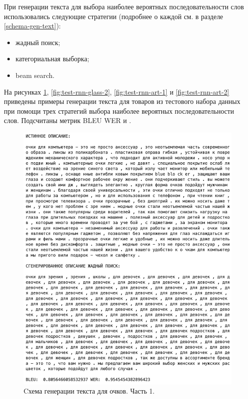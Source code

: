 \documentclass[a4paper,12pt]{extarticle}
\begin{document}
При генерации текста для выбора наиболее вероятных последовательности слов использовались следующие стратегии (подробнее о каждой см. в разделе \ref{schema-gen-text}):
\begin{itemize}
	\item жадный поиск;
	\item категориальная выборка;
	\item beam search.
\end{itemize}

На рисунках \ref{fig:test-rnn-glass-1}, \ref{fig:test-rnn-glass-2}, \ref{fig:test-rnn-art-1} и \ref{fig:test-rnn-art-2} приведены примеры генерации текста для товаров из тестового набора данных при помощи трех стратегий выбора наиболее вероятных последовательности слов. Подсчитаны метрик BLEU WER и .

\begin{figure}[ht]
	\centering
	\includegraphics[scale=0.4]{test-rnn-glass-1.png}
	\caption{Cхема генерации текста для очков. Часть 1.}
	\label{fig:test-rnn-glass-1}
\end{figure}
\end{document}
